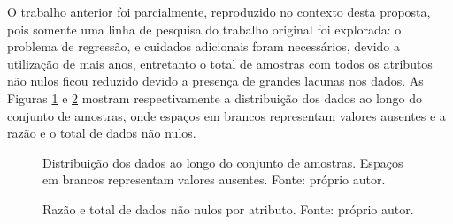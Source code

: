 O trabalho anterior \cite{REZENDE:2009, REZENDE:2010} foi parcialmente, reproduzido no contexto desta proposta, pois somente uma linha de pesquisa do trabalho original foi explorada: o problema de regressão, e cuidados adicionais foram necessários, devido a utilização de mais anos, entretanto o total de amostras com todos os atributos não nulos ficou reduzido devido a presença de grandes lacunas nos dados. As Figuras \ref{fig:distribution} e \ref{fig:nulltotal} mostram respectivamente a distribuição dos dados ao longo do conjunto de amostras, onde espaços em brancos representam valores ausentes e a razão e o total de dados não nulos.

\begin{figure}[H]
\centering
{}
\caption{Distribuição dos dados ao longo do conjunto de amostras. Espaços em brancos representam valores ausentes. Fonte: próprio autor.}
\label{fig:distribution}
\end{figure}

\begin{figure}[H]
\centering
{}
\caption{Razão e total de dados não nulos por atributo. Fonte: próprio autor.}
\label{fig:nulltotal}
\end{figure}

